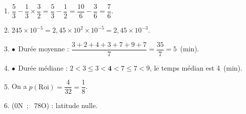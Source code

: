 \documentclass[10pt]{article}
\begin{document}
%
%
%

\begin{enumerate}
\item $\dfrac{5}{3} - \dfrac{1}{3}\times \dfrac{3}{2} = \dfrac{5}{3} - \dfrac{1}{2} = \dfrac{10}{6} - \dfrac{3}{6} = \dfrac{7}{6}$.
\item $245 \times 10^{-5} = 2,45 \times 10^2 \times 10^{-5} = 2,45 \times 10^{-3}$.
\item $\bullet~~$Durée moyenne : $\dfrac{3 + 2 + 4 + 3 + 7 + 9 + 7}{7} = \dfrac{35}{7} = 5$~(min).

\item $\bullet~~$Durée médiane : $2 < 3 \leqslant 3 < \textbf{4} < 7 \leqslant 7 < 9$, le temps médian est 4~(min).
\item On a $p(\text{Roi}) = \dfrac{4}{32} = \dfrac{1}{8}$.
\item (0\degre N~;~ 78\degre O) : latitude nulle.
\end{enumerate}
\end{document}
